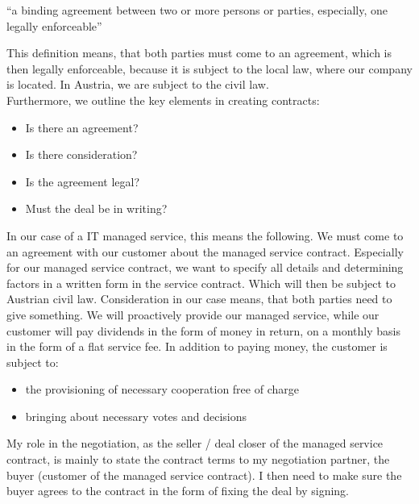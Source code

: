 \begin{center}
	\enquote{a binding agreement between two or more persons or parties, especially, one legally enforceable} \autocite{merriamWebsterDefinitionContract}
\end{center}

\noindent This definition means, that both parties must come to an agreement, which is then 
legally enforceable, because it is subject to the local law, where our company is located. 
In Austria, we are subject to the civil law. \\

\noindent Furthermore, we outline the key elements in creating contracts:

\begin{center}
	\begin{itemize}
		\item Is there an agreement?
		\item Is there consideration?
		\item Is the agreement legal?
		\item Must the deal be in writing?
	\end{itemize}
\end{center}

\noindent In our case of a IT managed service, this means the following. 
We must come to an agreement with our customer about the managed service contract.
Especially for our managed service contract, we want to specify all details and
determining factors in a written form in the service contract. Which will then
be subject to Austrian civil law. Consideration in our case means, that
both parties need to give something. We will proactively provide our managed service,
while our customer will pay dividends in the form of money in return, 
on a monthly basis in the form of a flat service fee. In addition to paying money,
the customer is subject to:

\begin{center}
	\begin{itemize}
		\item the provisioning of necessary cooperation free of charge
		\item bringing about necessary votes and decisions
	\end{itemize}
\end{center}

\noindent My role in the negotiation, as the seller / deal closer of the managed service contract,
is mainly to state the contract terms to my negotiation partner, the buyer
(customer of the managed service contract). I then need to make sure the buyer
agrees to the contract in the form of fixing the deal by signing.

